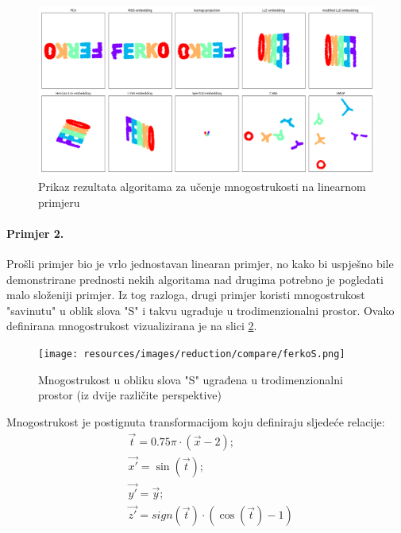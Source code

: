 \documentclass[times, utf8, diplomski]{fer}
\begin{document}
\begin{figure}[htb]
    \centering
    \includegraphics[width=\textwidth]{resources/images/reduction/compare/x3d.png}
    \caption{Prikaz rezultata algoritama za učenje mnogostrukosti na linearnom primjeru}
    \label{fig:x3d}
\end{figure}

\paragraph{Primjer 2.} Prošli primjer bio je vrlo jednostavan linearan primjer, no kako bi uspješno bile demonstrirane prednosti nekih algoritama nad drugima potrebno je pogledati malo složeniji primjer. Iz tog razloga, drugi primjer koristi mnogostrukost "savinutu" u oblik slova "S" i takvu ugrađuje u trodimenzionalni prostor. Ovako definirana mnogostrukost vizualizirana je na slici \ref{fig:ferkoS}.

\begin{figure}[htb]
    \centering
    \texttt{[image: resources/images/reduction/compare/ferkoS.png]}
    \caption{Mnogostrukost u obliku slova "S" ugrađena u trodimenzionalni prostor (iz dvije različite perspektive)}
    \label{fig:ferkoS}
\end{figure}

Mnogostrukost je postignuta transformacijom koju definiraju sljedeće relacije:
\begin{align}
     & \vec{t} = 0.75 \pi \cdot (\vec{x} - 2);
    \\
     & \vec{x'} = \sin(\vec{t});
    \\%
     & \vec{y'} = \vec{y};
    \\%
     & \vec{z'} = sign(\vec{t}) \cdot (\cos(\vec{t}) - 1)
    \label{eq:makeS}
\end{align}
\end{document}
